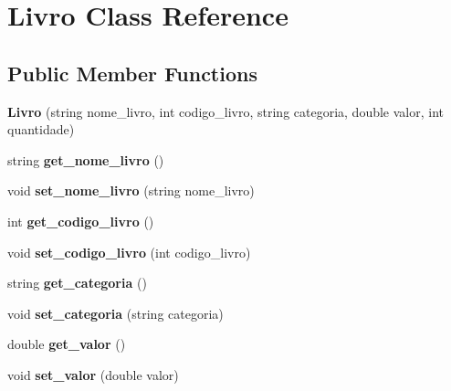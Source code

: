 \hypertarget{class_livro}{}\section{Livro Class Reference}
\label{class_livro}
\subsection*{Public Member Functions}
\begin{DoxyCompactItemize}
\item 
\mbox{\label{class_livro_a1de7a3e9ab043a18e07ed5de2a69a703}} 
{\bfseries Livro} (string nome\+\_\+livro, int codigo\+\_\+livro, string categoria, double valor, int quantidade)
\item 
\mbox{\label{class_livro_aef9feeb00689ed50335053cf51f89c93}} 
string {\bfseries get\+\_\+nome\+\_\+livro} ()
\item 
\mbox{\label{class_livro_aa929cc65370f6250b69eb437e8039f19}} 
void {\bfseries set\+\_\+nome\+\_\+livro} (string nome\+\_\+livro)
\item 
\mbox{\label{class_livro_a2bf1a0fcaa06b753903f2f07f7373bf6}} 
int {\bfseries get\+\_\+codigo\+\_\+livro} ()
\item 
\mbox{\label{class_livro_ab7101b172aae2011117b235d4abfa58f}} 
void {\bfseries set\+\_\+codigo\+\_\+livro} (int codigo\+\_\+livro)
\item 
\mbox{\label{class_livro_acc54282e8093f3f3628cf291ebbfce7f}} 
string {\bfseries get\+\_\+categoria} ()
\item 
\mbox{\label{class_livro_a1c6fea76f1732e959720971c9791d125}} 
void {\bfseries set\+\_\+categoria} (string categoria)
\item 
\mbox{\label{class_livro_ad3289981dc5bf28e927d769d2e44af28}} 
double {\bfseries get\+\_\+valor} ()
\item 
\mbox{\label{class_livro_a2a35d394858c7a432ed483994288fad8}} 
void {\bfseries set\+\_\+valor} (double valor)
\item 

\end{DoxyCompactItemize}
